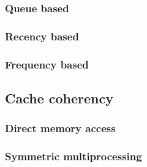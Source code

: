 \subsubsection{Queue based}
\subsubsection{Recency based}
\subsubsection{Frequency based}
%
\subsection{Cache coherency}
\subsubsection{Direct memory access}
\subsubsection{Symmetric multiprocessing}
%
